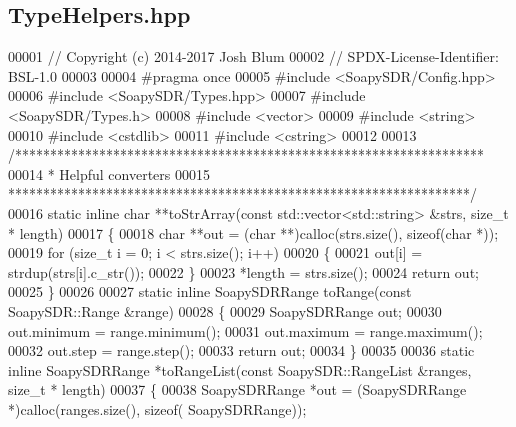 \subsection{Type\+Helpers.\+hpp}
\label{TypeHelpers_8hpp_source}

\begin{DoxyCode}
00001 \textcolor{comment}{// Copyright (c) 2014-2017 Josh Blum}
00002 \textcolor{comment}{// SPDX-License-Identifier: BSL-1.0}
00003 
00004 \textcolor{preprocessor}{#pragma once}
00005 \textcolor{preprocessor}{#include <SoapySDR/Config.hpp>}
00006 \textcolor{preprocessor}{#include <SoapySDR/Types.hpp>}
00007 \textcolor{preprocessor}{#include <SoapySDR/Types.h>}
00008 \textcolor{preprocessor}{#include <vector>}
00009 \textcolor{preprocessor}{#include <string>}
00010 \textcolor{preprocessor}{#include <cstdlib>}
00011 \textcolor{preprocessor}{#include <cstring>}
00012 
00013 \textcolor{comment}{/*******************************************************************}
00014 \textcolor{comment}{ * Helpful converters}
00015 \textcolor{comment}{ ******************************************************************/}
00016 \textcolor{keyword}{static} \textcolor{keyword}{inline} \textcolor{keywordtype}{char} **toStrArray(\textcolor{keyword}{const} std::vector<std::string> &strs, \textcolor{keywordtype}{size\_t} *
      length)
00017 \{
00018     \textcolor{keywordtype}{char} **out = (\textcolor{keywordtype}{char} **)calloc(strs.size(), \textcolor{keyword}{sizeof}(\textcolor{keywordtype}{char} *));
00019     \textcolor{keywordflow}{for} (\textcolor{keywordtype}{size\_t} i = 0; i < strs.size(); i++)
00020     \{
00021         out[i] = strdup(strs[i].c\_str());
00022     \}
00023     *length = strs.size();
00024     \textcolor{keywordflow}{return} out;
00025 \}
00026 
00027 \textcolor{keyword}{static} \textcolor{keyword}{inline} SoapySDRRange toRange(\textcolor{keyword}{const} SoapySDR::Range &range)
00028 \{
00029     SoapySDRRange out;
00030     out.minimum = range.minimum();
00031     out.maximum = range.maximum();
00032     out.step = range.step();
00033     \textcolor{keywordflow}{return} out;
00034 \}
00035 
00036 \textcolor{keyword}{static} \textcolor{keyword}{inline} SoapySDRRange *toRangeList(\textcolor{keyword}{const} SoapySDR::RangeList &ranges, \textcolor{keywordtype}{size\_t} *
      length)
00037 \{
00038     SoapySDRRange *out = (SoapySDRRange *)calloc(ranges.size(), \textcolor{keyword}{sizeof}(
      SoapySDRRange));

\end{DoxyCode}
